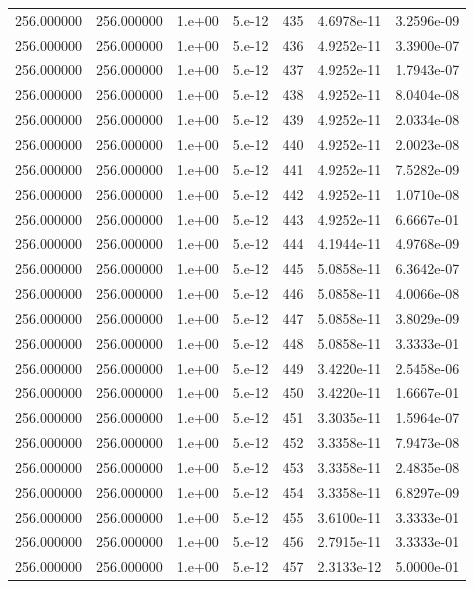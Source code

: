 \begin{table}[htbp]
\begin{tabular}{rrrrrrr}
256.000000 & 256.000000 & 1.e+00 & 5.e-12 & 435 & 4.6978e-11 & 3.2596e-09 \\
256.000000 & 256.000000 & 1.e+00 & 5.e-12 & 436 & 4.9252e-11 & 3.3900e-07 \\
256.000000 & 256.000000 & 1.e+00 & 5.e-12 & 437 & 4.9252e-11 & 1.7943e-07 \\
256.000000 & 256.000000 & 1.e+00 & 5.e-12 & 438 & 4.9252e-11 & 8.0404e-08 \\
256.000000 & 256.000000 & 1.e+00 & 5.e-12 & 439 & 4.9252e-11 & 2.0334e-08 \\
256.000000 & 256.000000 & 1.e+00 & 5.e-12 & 440 & 4.9252e-11 & 2.0023e-08 \\
256.000000 & 256.000000 & 1.e+00 & 5.e-12 & 441 & 4.9252e-11 & 7.5282e-09 \\
256.000000 & 256.000000 & 1.e+00 & 5.e-12 & 442 & 4.9252e-11 & 1.0710e-08 \\
256.000000 & 256.000000 & 1.e+00 & 5.e-12 & 443 & 4.9252e-11 & 6.6667e-01 \\
256.000000 & 256.000000 & 1.e+00 & 5.e-12 & 444 & 4.1944e-11 & 4.9768e-09 \\
256.000000 & 256.000000 & 1.e+00 & 5.e-12 & 445 & 5.0858e-11 & 6.3642e-07 \\
256.000000 & 256.000000 & 1.e+00 & 5.e-12 & 446 & 5.0858e-11 & 4.0066e-08 \\
256.000000 & 256.000000 & 1.e+00 & 5.e-12 & 447 & 5.0858e-11 & 3.8029e-09 \\
256.000000 & 256.000000 & 1.e+00 & 5.e-12 & 448 & 5.0858e-11 & 3.3333e-01 \\
256.000000 & 256.000000 & 1.e+00 & 5.e-12 & 449 & 3.4220e-11 & 2.5458e-06 \\
256.000000 & 256.000000 & 1.e+00 & 5.e-12 & 450 & 3.4220e-11 & 1.6667e-01 \\
256.000000 & 256.000000 & 1.e+00 & 5.e-12 & 451 & 3.3035e-11 & 1.5964e-07 \\
256.000000 & 256.000000 & 1.e+00 & 5.e-12 & 452 & 3.3358e-11 & 7.9473e-08 \\
256.000000 & 256.000000 & 1.e+00 & 5.e-12 & 453 & 3.3358e-11 & 2.4835e-08 \\
256.000000 & 256.000000 & 1.e+00 & 5.e-12 & 454 & 3.3358e-11 & 6.8297e-09 \\
256.000000 & 256.000000 & 1.e+00 & 5.e-12 & 455 & 3.6100e-11 & 3.3333e-01 \\
256.000000 & 256.000000 & 1.e+00 & 5.e-12 & 456 & 2.7915e-11 & 3.3333e-01 \\
256.000000 & 256.000000 & 1.e+00 & 5.e-12 & 457 & 2.3133e-12 & 5.0000e-01 \\

\end{tabular}
\end{table}
